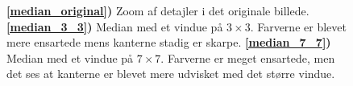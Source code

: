 {\begin{figure}[!h]
    \centering
    \hspace{1em}
    \hspace{1em}
    \caption[]{
        \textbf{\ref{median_original})} Zoom af detajler i det originale billede.
        \textbf{\ref{median_3_3})} Median med et vindue på $3\times{}3$.
        Farverne er blevet mere ensartede mens kanterne stadig er
        skarpe.
        \textbf{\ref{median_7_7})} Median med et vindue på $7\times{}7$. Farverne
        er meget ensartede, men det ses at kanterne er blevet mere
        udvisket med det større vindue.
    }
    \label{median_metode}
\end{figure}

}

